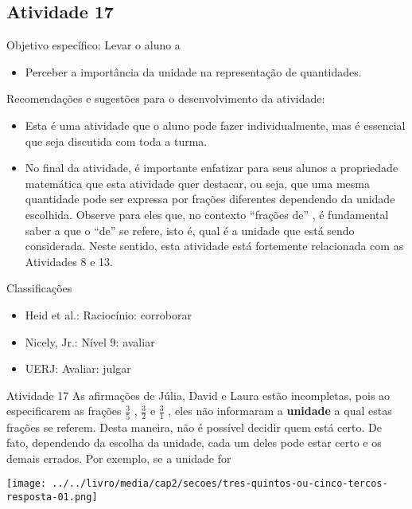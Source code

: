 \documentclass[oneside]{book}
\begin{document}
\begin{multicols}{2}
\subsection{Atividade 17}



  Objetivo específico: Levar o aluno a
\begin{itemize} %
    \item       Perceber a importância da unidade na representação de quantidades.
\end{itemize} %



  Recomendações e sugestões para o desenvolvimento da atividade:
\begin{itemize} %
    \item       Esta é uma atividade que o aluno pode fazer individualmente, mas é essencial que seja discutida com toda a turma.
    \item       No final da atividade, é importante enfatizar para seus alunos a propriedade matemática que esta atividade quer destacar, ou seja, que uma mesma quantidade pode ser expressa por frações diferentes dependendo da unidade escolhida. Observe para eles que, no contexto       ``frações de''      , é fundamental saber a que o       ``de''       se refere, isto é, qual é a unidade que está sendo considerada. Neste sentido, esta atividade está fortemente relacionada com as Atividades 8 e 13.
\end{itemize} %


  Classificações
\begin{itemize} %
    \item       Heid et al.: Raciocínio: corroborar
    \item       Nicely, Jr.: Nível 9: avaliar
    \item       UERJ: Avaliar: julgar
\end{itemize} %


\begin{resposta*}{Atividade 17}
  As afirmações de Júlia, David e Laura estão incompletas, pois ao especificarem as frações   $\frac{3}{5}$  ,   $\frac{3}{2}$   e   $\frac{3}{1}$  , eles não informaram a   {\bf unidade}   a qual estas frações se referem. Desta maneira, não é possível decidir quem está certo. De fato, dependendo da escolha da unidade, cada um deles pode estar certo e os demais errados. Por exemplo, se a unidade for

    \texttt{[image: ../../livro/media/cap2/secoes/tres-quintos-ou-cinco-tercos-resposta-01.png]}


\end{resposta*}
\end{multicols}
\end{document}
